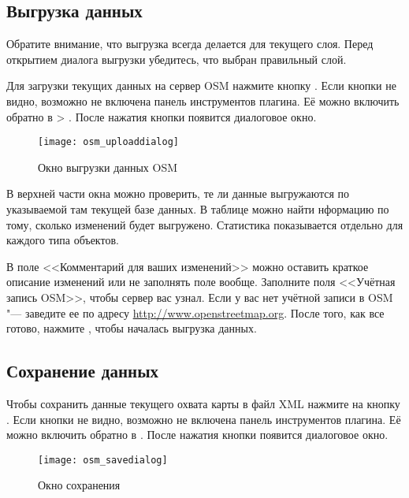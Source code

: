 \subsection{Выгрузка данных}

Обратите внимание, что выгрузка всегда делается для текущего слоя. Перед
открытием диалога выгрузки убедитесь, что выбран правильный слой.

Для загрузки текущих данных на сервер OSM нажмите кнопку
. Если кнопки не видно,
возможно не включена панель инструментов плагина. Её можно включить
обратно в  \arrow {} >
. После нажатия кнопки 
появится диалоговое окно.

\begin{figure}[ht]
   \centering
   \texttt{[image: osm\_uploaddialog]}
   \caption{Окно выгрузки данных OSM \wincaption}\label{fig:osmupload}
\end{figure}

В верхней части окна можно проверить, те ли данные выгружаются по
указываемой там текущей базе данных. В таблице можно найти нформацию по
тому, сколько изменений будет выгружено. Статистика показывается
отдельно для каждого типа объектов.

В поле <<Комментарий для ваших изменений>> можно оставить краткое
описание изменений или не заполнять поле вообще. Заполните поля
<<Учётная запись OSM>>, чтобы сервер вас узнал. Если у вас нет учётной
записи в OSM "--- заведите ее по адресу \url{http://www.openstreetmap.org}.
После того, как все готово, нажмите , чтобы началась
выгрузка данных.

\subsection{Сохранение данных}

Чтобы сохранить данные текущего охвата карты в файл XML нажмите на кнопку
. Если кнопки не видно, возможно
не включена панель инструментов плагина. Её можно включить обратно в
 \arrow {} \arrow
{}. После нажатия кнопки появится диалоговое
окно.

\begin{figure}[ht]
   \centering
   \texttt{[image: osm\_savedialog]}
   \caption{Окно сохранения \wincaption}\label{fig:osmsave}
\end{figure}

